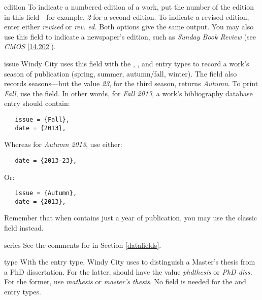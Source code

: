 \documentclass[11pt,letterpaper,oneside]{article}
\begin{document}
\begin{marglist}

\item[edition] To indicate a numbered edition of a work, put the
number of the edition in this field---for example, \textit{2} for a
second edition. To indicate a revised edition, enter either
\textit{revised} or \textit{rev. ed.} Both options give the same
output. You may also use this field to indicate a newspaper's edition,
such as \textit{Sunday Book Review} (see \textit{CMOS} \ref{14.202}).

\item[issue] Windy City uses this field with the ,
, and  entry types to record a work's
season of publication (spring, summer, autumn/fall, winter). The
 field also records seasons---but the value \textit{23},
for the third season, returns \textit{Autumn}. To print \textit{Fall},
use the  field. In other words, for \textit{Fall
2013}, a work's bibliography database entry should contain:

\begin{verbatim}
   issue = {Fall},
   date = {2013},
\end{verbatim}

\noindent Whereas for \textit{Autumn 2013}, use either:

\begin{verbatim}
   date = {2013-23},
\end{verbatim}

\noindent Or:

\begin{verbatim}
   issue = {Autumn},
   date = {2013},
\end{verbatim}

\noindent Remember that when  contains just a year of
publication, you may use the classic  field instead.

\item[series] See the comments for  in Section
\ref{datafields}.

\item[type] With the  entry type, Windy City uses
 to distinguish a Master's thesis from a PhD
dissertation. For the latter,  should have the value
\textit{phdthesis} or \textit{PhD diss.} For the former, use
\textit{mathesis} or \textit{master's thesis}. No 
field is needed for the  and 
entry types.


\end{marglist}
\end{document}

